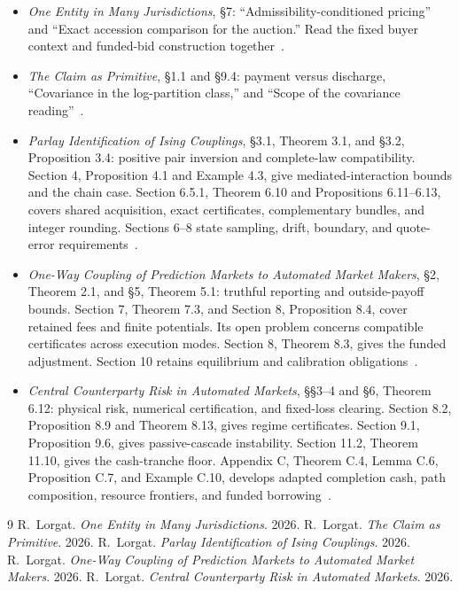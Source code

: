 \documentclass{momentum}
\begin{document}
\begin{itemize}
\item \emph{One Entity in Many Jurisdictions}, \S7: ``Admissibility-conditioned pricing'' and ``Exact accession comparison for the auction.'' Read the fixed buyer context and funded-bid construction together~\cite{entity}.

\item \emph{The Claim as Primitive}, \S1.1 and \S9.4: payment versus discharge, ``Covariance in the log-partition class,'' and ``Scope of the covariance reading''~\cite{claim}.

\item \emph{Parlay Identification of Ising Couplings}, \S3.1, Theorem 3.1, and \S3.2, Proposition 3.4: positive pair inversion and complete-law compatibility. Section 4, Proposition 4.1 and Example 4.3, give mediated-interaction bounds and the chain case. Section 6.5.1, Theorem 6.10 and Propositions 6.11--6.13, covers shared acquisition, exact certificates, complementary bundles, and integer rounding. Sections 6--8 state sampling, drift, boundary, and quote-error requirements~\cite{parlay}.

\item \emph{One-Way Coupling of Prediction Markets to Automated Market Makers}, \S2, Theorem 2.1, and \S5, Theorem 5.1: truthful reporting and outside-payoff bounds. Section 7, Theorem 7.3, and Section 8, Proposition 8.4, cover retained fees and finite potentials. Its open problem concerns compatible certificates across execution modes. Section 8, Theorem 8.3, gives the funded adjustment. Section 10 retains equilibrium and calibration obligations~\cite{coupling}.

\item \emph{Central Counterparty Risk in Automated Markets}, \S\S3--4 and \S6, Theorem 6.12: physical risk, numerical certification, and fixed-loss clearing. Section 8.2, Proposition 8.9 and Theorem 8.13, gives regime certificates. Section 9.1, Proposition 9.6, gives passive-cascade instability. Section 11.2, Theorem 11.10, gives the cash-tranche floor. Appendix C, Theorem C.4, Lemma C.6, Proposition C.7, and Example C.10, develops adapted completion cash, path composition, resource frontiers, and funded borrowing~\cite{ccp}.
\end{itemize}

\begin{thebibliography}{9}
 R.~Lorgat. \emph{One Entity in Many Jurisdictions}. 2026.
 R.~Lorgat. \emph{The Claim as Primitive}. 2026.
 R.~Lorgat. \emph{Parlay Identification of Ising Couplings}. 2026.
 R.~Lorgat. \emph{One-Way Coupling of Prediction Markets to Automated Market Makers}. 2026.
 R.~Lorgat. \emph{Central Counterparty Risk in Automated Markets}. 2026.
\end{thebibliography}
\end{document}
